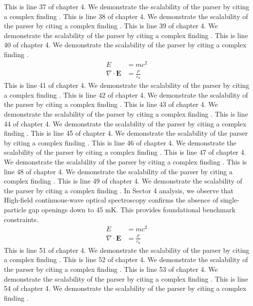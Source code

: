 This is line 37 of chapter 4. We demonstrate the scalability of the parser by citing a complex finding \cite{ref4_37}.
This is line 38 of chapter 4. We demonstrate the scalability of the parser by citing a complex finding \cite{ref4_38}.
This is line 39 of chapter 4. We demonstrate the scalability of the parser by citing a complex finding \cite{ref4_39}.
This is line 40 of chapter 4. We demonstrate the scalability of the parser by citing a complex finding \cite{ref4_40}.
\begin{align*}
  E &= mc^2 \\
  \nabla \cdot \mathbf{E} &= \frac{\rho}{\varepsilon_0}
\end{align*}
This is line 41 of chapter 4. We demonstrate the scalability of the parser by citing a complex finding \cite{ref4_41}.
This is line 42 of chapter 4. We demonstrate the scalability of the parser by citing a complex finding \cite{ref4_42}.
This is line 43 of chapter 4. We demonstrate the scalability of the parser by citing a complex finding \cite{ref4_43}.
This is line 44 of chapter 4. We demonstrate the scalability of the parser by citing a complex finding \cite{ref4_44}.
This is line 45 of chapter 4. We demonstrate the scalability of the parser by citing a complex finding \cite{ref4_45}.
This is line 46 of chapter 4. We demonstrate the scalability of the parser by citing a complex finding \cite{ref4_46}.
This is line 47 of chapter 4. We demonstrate the scalability of the parser by citing a complex finding \cite{ref4_47}.
This is line 48 of chapter 4. We demonstrate the scalability of the parser by citing a complex finding \cite{ref4_48}.
This is line 49 of chapter 4. We demonstrate the scalability of the parser by citing a complex finding \cite{ref4_49}.
In Sector 4 analysis, we observe that High-field continuous-wave optical spectroscopy confirms the absence of single-particle gap openings down to 45 mK. This provides foundational benchmark constraints.
\begin{align*}
  E &= mc^2 \\
  \nabla \cdot \mathbf{E} &= \frac{\rho}{\varepsilon_0}
\end{align*}
This is line 51 of chapter 4. We demonstrate the scalability of the parser by citing a complex finding \cite{ref4_51}.
This is line 52 of chapter 4. We demonstrate the scalability of the parser by citing a complex finding \cite{ref4_52}.
This is line 53 of chapter 4. We demonstrate the scalability of the parser by citing a complex finding \cite{ref4_53}.
This is line 54 of chapter 4. We demonstrate the scalability of the parser by citing a complex finding \cite{ref4_54}.
